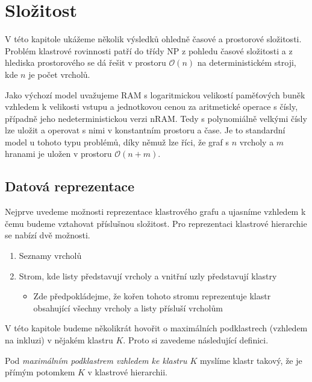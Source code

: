 \chapter{Složitost}

V této kapitole ukážeme několik výsledků ohledně časové a prostorové složitosti.
Problém klastrové rovinnosti patří do třídy NP z pohledu časové složitosti a z hlediska prostorového se dá řešit v prostoru $\mathcal{O}(n)$ na deterministickém stroji, kde $n$ je počet vrcholů.

Jako výchozí model uvažujeme RAM s logaritmickou velikostí paměťových buněk vzhledem k velikosti vstupu a jednotkovou cenou za aritmetické operace s čísly, případně jeho nedeterministickou verzi nRAM. Tedy s  polynomiálně velkými čísly lze uložit a operovat s nimi v konstantním prostoru a čase. Je to standardní model u tohoto typu problémů, díky němuž lze říci, že graf s $n$ vrcholy a $m$ hranami je uložen v prostoru $\mathcal O (n+m)$.

\section{Datová reprezentace}
Nejprve uvedeme možnosti reprezentace klastrového grafu a ujasníme vzhledem k čemu budeme vztahovat příslušnou složitost. 
Pro reprezentaci klastrové hierarchie se nabízí dvě možnosti.

\begin{enumerate}
\item Seznamy vrcholů
\item Strom, kde listy představují vrcholy a vnitřní uzly představují klastry
\begin{itemize}
\item Zde předpokládejme, že kořen tohoto stromu reprezentuje klastr obsahující všechny vrcholy a listy přísluší vrcholům
\end{itemize}
\end{enumerate}

V této kapitole budeme několikrát hovořit o maximálních podklastrech (vzhledem na inkluzi) v nějakém klastru $K$. Proto si zavedeme následující definici.
\begin{defn}
Pod \textit{maximálním podklastrem vzhledem ke klastru $K$} myslíme klastr takový, že je přímým potomkem $K$ v klastrové hierarchii.
\end{defn}

